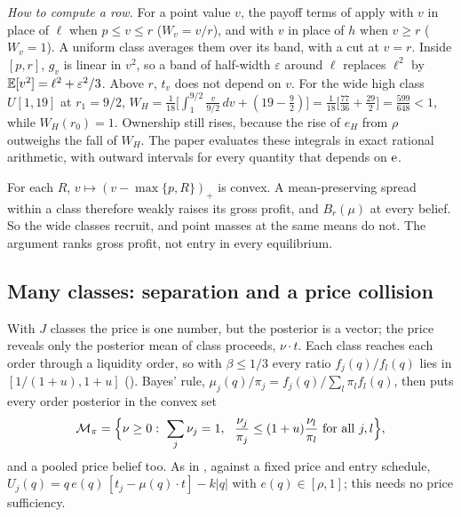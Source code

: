 \emph{How to compute a row.} For a point value \(v\), the payoff terms of  apply with \(v\)
in place of \(\ell\) when \(p\le v\le r\) (\(W_v=v/r\)), and with \(v\) in place of \(h\) when \(v\ge r\) (\(W_v=1\)). A
uniform class averages them over its band, with a cut at \(v=r\). Inside \([p,r]\), \(g_v\) is linear in \(v^2\), so a
band of half-width \(\varepsilon\) around \(\ell\) replaces \(\ell^2\) by \(\mathbb{E}[v^2]=\ell^2+\varepsilon^2/3\). Above \(r\),
\(t_v\) does not depend on \(v\). For the wide high class \(U[1,19]\) at \(r_1=9/2\),
\(W_H=\frac1{18}\bigl[\int_1^{9/2}\frac{v}{9/2}\,dv+(19-\frac92)\bigr]=\frac1{18}\bigl[\frac{77}{36}+\frac{29}2\bigr]
=\frac{599}{648}<1\), while \(W_H(r_0)=1\). Ownership still rises, because the rise of \(e_H\) from \(\rho\) outweighs
the fall of \(W_H\). The paper evaluates these integrals in exact rational arithmetic, with outward intervals for every
quantity that depends on \(\mathrm{e}\).

\begin{intuition}
For each \(R\), \(v\mapsto(v-\max\{p,R\})_+\) is convex. A mean-preserving spread within a class therefore weakly
raises its gross profit, and \(B_r(\mu)\) at every belief. So the wide classes recruit, and point masses at the same
means do not. The argument ranks gross profit, not entry in every equilibrium.
\end{intuition}

\subsection{Many classes: separation and a price collision}\label{sec:10_robustness-many}

With \(J\) classes the price is one number, but the posterior is a vector; the price reveals only the posterior mean
of class proceeds, \(\nu\cdot t\). Each class reaches each order through a liquidity order, so with \(\beta\le1/3\)
every ratio \(f_j(q)/f_l(q)\) lies in \([1/(1+u),1+u]\) (). Bayes' rule,
\(\mu_j(q)/\pi_j=f_j(q)/\sum_l\pi_lf_l(q)\), then puts every order posterior in the convex set
\[
\mathcal M_\pi=\Bigl\{\nu\ge0:\ \sum_j\nu_j=1,\ \ \frac{\nu_j}{\pi_j}\le(1+u)\frac{\nu_l}{\pi_l}\ \text{for all }j,l\Bigr\},
\]
and a pooled price belief too. As in , against a fixed price and entry schedule,
\(U_j(q)=q\,e(q)\,[t_j-\mu(q)\cdot t]-k|q|\) with \(e(q)\in[\rho,1]\); this needs no price sufficiency.

